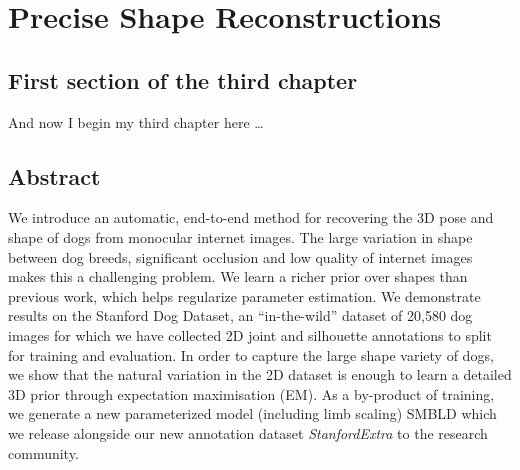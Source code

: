 \chapter{Precise Shape Reconstructions}

\ifpdf
    \graphicspath{{Chapter5/Figs/Raster/}{Chapter5/Figs/PDF/}{Chapter5/Figs/}}
\else
    \graphicspath{{Chapter5/Figs/Vector/}{Chapter5/Figs/}}
\fi

\section{First section of the third chapter}
And now I begin my third chapter here \dots

\def\E#1{E_\textrm{#1}}
\def\L#1{L_{\textrm{#1}}}
\newcommand\inv[1]{\left.#1\right.^{-1}}
\newcommand\transpose[1]{\left.#1\right.^{T}}
\newcommand{\anote}[1]{{\color{red}[#1]}}



\def\ss#1{\vspace{-0ex}\subsubsection{#1}}

\section{Abstract}
We introduce an automatic, end-to-end method for recovering the 3D pose and shape of dogs from monocular internet images. 
The large variation in shape between dog breeds, significant occlusion and low quality of internet images makes this a challenging problem.
We learn a richer prior over shapes than previous work, which helps regularize parameter estimation.
We demonstrate results on the Stanford Dog Dataset, an ``in-the-wild'' dataset of 20,580 dog images for which we have collected 2D joint and silhouette annotations to split for training and evaluation. 
In order to capture the large shape variety of dogs, we show that the natural variation in the 2D dataset is enough to learn a detailed 3D prior through expectation maximisation (EM).
As a by-product of training, we generate a new parameterized model (including limb scaling) SMBLD which we release alongside our new annotation dataset \emph{StanfordExtra} to the research community.

